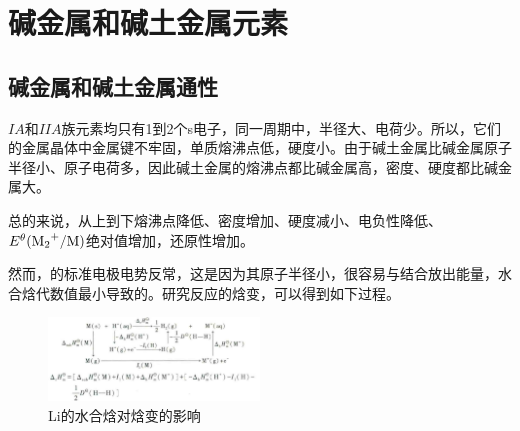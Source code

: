 \documentclass[a4paper,UTF8]{article}
\begin{document}
\section{碱金属和碱土金属元素}

\subsection{碱金属和碱土金属通性}

$IA$和$IIA$族元素均只有1到2个s电子，同一周期中，半径大、电荷少。所以，它们的金属晶体中金属键不牢固，单质熔沸点低，硬度小。由于碱土金属比碱金属原子半径小、原子电荷多，因此碱土金属的熔沸点都比碱金属高，密度、硬度都比碱金属大。

总的来说，从上到下熔沸点降低、密度增加、硬度减小、电负性降低、$E^{\theta}(\ce{M2+}/\ce{M})$绝对值增加，还原性增加。

然而，的标准电极电势反常，这是因为其原子半径小，很容易与结合放出能量，水合焓代数值最小导致的。研究反应的焓变，可以得到如下过程。

\begin{figure}[htpb]
	\centering
	\includegraphics[width=0.5\textwidth]{figure//Li的电极电势反常的原因.png}
	\caption{Li的水合焓对焓变的影响}
	\label{fig:}
\end{figure}
\end{document}
